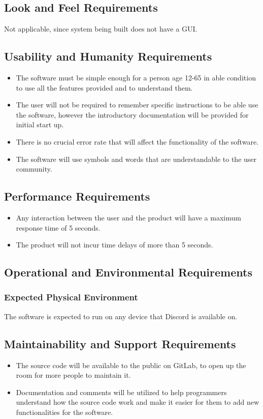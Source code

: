 \documentclass[12pt, titlepage]{article}
\begin{document}
\subsection{Look and Feel Requirements}
Not applicable, since system being built does not have a GUI. 
\subsection{Usability and Humanity Requirements}
\begin{itemize}
\item The software must be simple enough for a person age 12-65 in able condition to use all the features provided and to understand them. 
\item The user will not be required to remember specific instructions to be able use the software, however the introductory documentation will be provided for initial start up.
\item There is no crucial error rate that will affect the functionality of the software. 
\item The software will use symbols and words that are understandable to the user community. 
\end{itemize}

\subsection{Performance Requirements}
\begin{itemize}
\item Any interaction between the user and the product will have a maximum response time of 5 seconds. 
\item The product will not incur time delays of more than 5 seconds. 
\end{itemize}
\subsection{Operational and Environmental Requirements}
\subsubsection {Expected Physical Environment}
The software is expected to run on any device that Discord is available on.


\subsection{Maintainability and Support Requirements}
\begin{itemize}
\item The source code will be available to the public on GitLab, to open up the room for more people to maintain it.

\item Documentation and comments will be utilized to help programmers understand how the source code work and make it easier for them to add new functionalities for the software.
\end{itemize}
\end{document}
